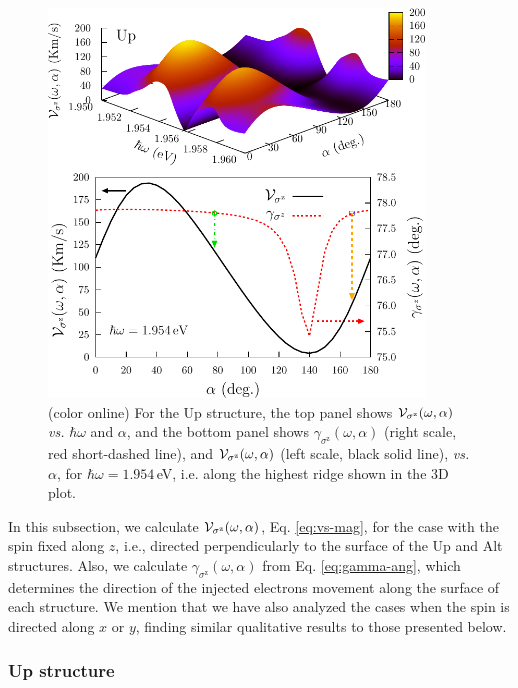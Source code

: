 \documentclass[floatfix,prb,aps,superscriptaddress,showpacs,11pt,preprint,letterpaper]{revtex4}
\def\tama{10cm}
\begin{document}
\begin{figure}[t]
\centering
\includegraphics[width=\tama]{fig5}
\caption{(color online) For the Up structure, the top panel shows ${\cal
V}_{\sigma^\mathrm{z}} (\omega,\alpha)$ {\it vs.} $\hbar\omega$ and $\alpha$,
and the bottom panel shows $\gamma_{\sigma^\mathrm{z}}
(\omega,\alpha)$ 
(right scale, red short-dashed line), and ${\cal V}_{\sigma^\mathrm{z}}
(\omega,\alpha)$ (left scale, black solid line), {\it vs.} $\alpha$, for
$\hbar\omega=1.954$\,eV, i.e. along the highest ridge shown in the 3D plot. }
\label{fig:up-vsz-w2}
\end{figure}

In this subsection, we calculate ${\cal V}_{\sigma^\mathrm{z}}(\omega,\alpha)$,
Eq. \eqref{eq:vs-mag}, for the case with the spin fixed along $z$, i.e.,
directed perpendicularly to the surface of the Up and Alt structures. Also, we
calculate $\gamma_{\sigma^\mathrm{z}}(\omega,\alpha)$ from Eq. 
\eqref{eq:gamma-ang}, which determines the direction  of the injected 
electrons movement along the surface of  each structure. We mention that we
have also  analyzed the cases when the spin  is directed along $x$ or
$y$, finding similar qualitative results to those presented below.

\subsubsection{Up structure}\label{up:fs}
\end{document}
